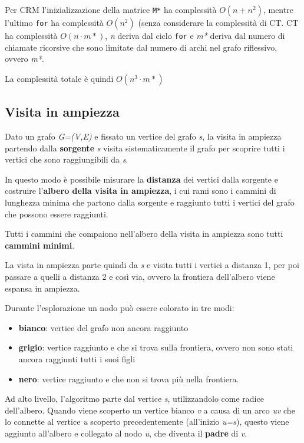Per \textsc{CRM} l'inizializzazione della matrice \texttt{M*} ha
complessità $O(n+n^2)$, mentre l'ultimo
\texttt{for} ha complessità $O(n^2)$ (senza considerare la complessità
di \textsc{CT}. \textsc{CT} ha complessità $O(n \cdot m* )$, \emph{n}
deriva dal ciclo \texttt{for} e \emph{m*} deriva dal numero di chiamate
ricorsive che sono limitate dal numero di archi nel grafo riflessivo,
ovvero \emph{m*}.

La complessità totale è quindi $O(n^3 \cdot m*)$

\subsection{Visita in ampiezza}\label{visita-in-ampiezza}

Dato un grafo \emph{G=(V,E)} e fissato un vertice del grafo \emph{s}, la
visita in ampiezza partendo dalla \textbf{sorgente} \emph{s} visita
sistematicamente il grafo per scoprire tutti i vertici che sono
raggiungibili da \emph{s}.

In questo modo è possibile misurare la \textbf{distanza} dei vertici
dalla sorgente e costruire l'\textbf{albero della visita in ampiezza}, i
cui rami sono i cammini di lunghezza minima che partono dalla sorgente e
raggiunto tutti i vertici del grafo che possono essere raggiunti.

Tutti i cammini che compaiono nell'albero della visita in ampiezza sono
tutti \textbf{cammini minimi}.

La vista in ampiezza parte quindi da \emph{s} e visita tutti i vertici a
distanza 1, per poi passare a quelli a distanza 2 e così via, ovvero la
frontiera dell'albero viene espansa in ampiezza.

Durante l'esplorazione un nodo può essere colorato in tre modi:

\begin{itemize}
\item
  \textbf{bianco}: vertice del grafo non ancora raggiunto
\item
  \textbf{grigio}: vertice raggiunto e che si trova sulla frontiera,
  ovvero non sono stati ancora raggiunti tutti i suoi figli
\item
  \textbf{nero}: vertice raggiunto e che non si trova più nella
  frontiera.
\end{itemize}

Ad alto livello, l'algoritmo parte dal vertice \emph{s}, utilizzandolo
come radice dell'albero. Quando viene scoperto un vertice bianco
\emph{v} a causa di un arco \emph{uv} che lo connette al vertice \emph{u}
scoperto precedentemente (all'inizio \emph{u=s}), questo viene aggiunto
all'albero e collegato al nodo \emph{u}, che diventa il \textbf{padre}
di \emph{v}.

